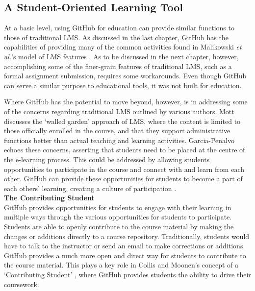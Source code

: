 \subsection{A Student-Oriented Learning Tool}
At a basic level, using GitHub for education can provide similar functions to those of traditional LMS. As discussed in the last chapter, GitHub has the capabilities of providing many of the common activities found in Malikowski \textit{et al.}'s model of LMS features \cite{malikowski2007model}. As to be discussed in the next chapter, however, accomplishing some of the finer-grain features of traditional LMS, such as a formal assignment submission, requires some workarounds. Even though GitHub can serve a similar purpose to educational tools, it was not built for education.

Where GitHub has the potential to move beyond, however, is in addressing some of the concerns regarding traditional LMS outlined by various authors. Mott \cite{mott2010envisioning} discusses the `walled garden' approach of LMS, where the content is limited to those officially enrolled in the course, and that they support administrative functions better than actual teaching and learning activities. Garcia-Penalvo \cite{garcia2011opening} echoes these concerns, asserting that students need to be placed at the centre of the e-learning process. This could be addressed by allowing students opportunities to participate in the course and connect with and learn from each other. GitHub can provide these opportunities for students to become a part of each others' learning, creating a culture of participation \cite{jenkins2009confronting}. \\

\textbf{The Contributing Student} \\
GitHub provides opportunities for students to engage with their learning in multiple ways through the various opportunities for students to participate. Students are able to openly contribute to the course material by making the changes or additions directly to a course repository. Traditionally, students would have to talk to the instructor or send an email to make corrections or additions. GitHub provides a much more open and direct way for students to contribute to the course material. This plays a key role in Collis and Moonen's concept of a `Contributing Student' \cite{collis2006contributing}, where GitHub provides students the ability to drive their coursework.


